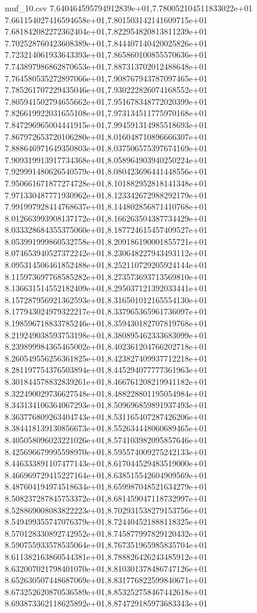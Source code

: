 \begin{filecontents*}{muf_10.csv}
7.640464595794912839e+01,7.780052104511833022e+01
7.661154027416594658e+01,7.801503142141609715e+01
7.681842082272362404e+01,7.822954820813811239e+01
7.702528760423608389e+01,7.844407140420025826e+01
7.723214061933643393e+01,7.865860100855570636e+01
7.743897986862870653e+01,7.887313702012488648e+01
7.764580535272897066e+01,7.908767943787097465e+01
7.785261707229435046e+01,7.930222826074168552e+01
7.805941502794655662e+01,7.951678348772020399e+01
7.826619922031655108e+01,7.973134511775970168e+01
7.847296965004441915e+01,7.994591314985518693e+01
7.867972653720106280e+01,8.016048710896666307e+01
7.888646971649350803e+01,8.037506575397674169e+01
7.909319913917734368e+01,8.058964903940250224e+01
7.929991480626540579e+01,8.080423696441448556e+01
7.950661671877274728e+01,8.101882952818141348e+01
7.971330487771930962e+01,8.123342672988292179e+01
7.991997928414768637e+01,8.144802856871410768e+01
8.012663993908137172e+01,8.166263504387734429e+01
8.033328684355375060e+01,8.187724615457409527e+01
8.053991999860532758e+01,8.209186190001855721e+01
8.074653940527372242e+01,8.230648227943493112e+01
8.095314506461852488e+01,8.252110729205924144e+01
8.115973697768585282e+01,8.273573693713569810e+01
8.136631514552182409e+01,8.295037121392033441e+01
8.157287956921362593e+01,8.316501012165554130e+01
8.177943024979322217e+01,8.337965365961736097e+01
8.198596718833785246e+01,8.359430182707819768e+01
8.219249038593753198e+01,8.380895462333683099e+01
8.239899984365465002e+01,8.402361204766202718e+01
8.260549556256361825e+01,8.423827409937712218e+01
8.281197754376503894e+01,8.445294077777361963e+01
8.301844578832839261e+01,8.466761208219941182e+01
8.322490029736627548e+01,8.488228801195054984e+01
8.343134106364067293e+01,8.509696859891937493e+01
8.363776809263404743e+01,8.531165407287426206e+01
8.384418139130856673e+01,8.552634448060689465e+01
8.405058096023221026e+01,8.574103982095857646e+01
8.425696679995598970e+01,8.595574009275242133e+01
8.446333891107477143e+01,8.617044529483519000e+01
8.466969729415227164e+01,8.638515542604909569e+01
8.487604194974518634e+01,8.659987048521634279e+01
8.508237287845753372e+01,8.681459047118732997e+01
8.528869008083822223e+01,8.702931538279153756e+01
8.549499355747076379e+01,8.724404521888118325e+01
8.570128330892742952e+01,8.745877997829120432e+01
8.590755933578535064e+01,8.767351965985835704e+01
8.611382163860544381e+01,8.788826426243485912e+01
8.632007021798401070e+01,8.810301378486747126e+01
8.652630507448687069e+01,8.831776822599840671e+01
8.673252620870536589e+01,8.853252758467442618e+01
8.693873362118625892e+01,8.874729185973683343e+01

\end{filecontents*}
